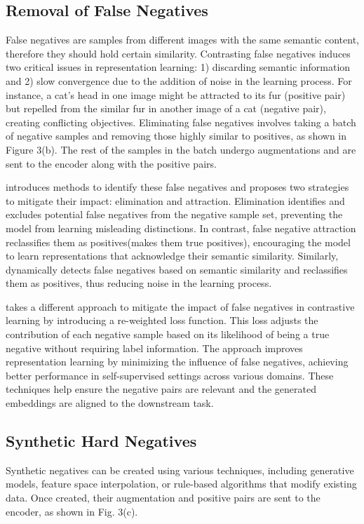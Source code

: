 \subsection{Removal of False Negatives}
False negatives are samples from different images with the same semantic content, therefore they should hold certain similarity. Contrasting false negatives induces two critical issues in representation learning: 1) discarding semantic information and 2) slow convergence due to the addition of noise in the learning process. For instance, a cat's head in one image might be attracted to its fur (positive pair) but repelled from the similar fur in another image of a cat (negative pair), creating conflicting objectives. Eliminating false negatives involves taking a batch of negative samples and removing those highly similar to positives, as shown in Figure 3(b). The rest of the samples in the batch undergo augmentations and are sent to the encoder along with the positive pairs.

\cite{huynh2022boosting} introduces methods to identify these false negatives and proposes two strategies to mitigate their impact: elimination and attraction. Elimination identifies and excludes potential false negatives from the negative sample set, preventing the model from learning misleading distinctions. In contrast, false negative attraction reclassifies them as positives(makes them true positives), encouraging the model to learn representations that acknowledge their semantic similarity. Similarly, \cite{chen2021incremental} dynamically detects false negatives based on semantic similarity and reclassifies them as positives, thus reducing noise in the learning process. 

\cite{chuang2020debiased} takes a different approach to mitigate the impact of false negatives in contrastive learning by introducing a re-weighted loss function. This loss adjusts the contribution of each negative sample based on its likelihood of being a true negative without requiring label information. The approach improves representation learning by minimizing the influence of false negatives, achieving better performance in self-supervised settings across various domains.
These techniques help ensure the negative pairs are relevant and the generated embeddings are aligned to the downstream task.


\subsection{Synthetic Hard Negatives}
Synthetic negatives can be created using various techniques, including generative models, feature space interpolation, or rule-based algorithms that modify existing data. Once created, their augmentation and positive pairs are sent to the encoder, as shown in Fig. 3(c).

